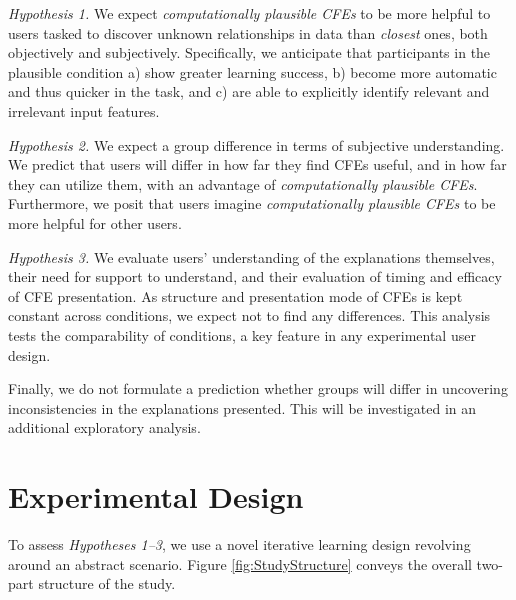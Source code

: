 \textit{Hypothesis 1.} We expect \textit{computationally plausible \glspl{CFE}} to be more helpful to users tasked to discover unknown relationships in data than \textit{closest} ones, both objectively and subjectively. 
Specifically, we anticipate that participants in the plausible condition a) show greater learning success, b) become more automatic and thus quicker in the task, and c) are able to explicitly identify relevant and irrelevant input features.

\textit{Hypothesis 2.} We expect a group difference in terms of subjective understanding.
We predict that users will differ in how far they find \glspl{CFE} useful, and in how far they can utilize them, with an advantage of \textit{computationally plausible \glspl{CFE}}. %
Furthermore, we posit that users imagine \textit{computationally plausible \glspl{CFE}} to be more helpful for other users. %

\textit{Hypothesis 3.} We evaluate users' understanding of the explanations themselves, their need for support to understand, and their evaluation of timing and efficacy of \gls{CFE} presentation. As structure and presentation mode of \glspl{CFE} is kept constant across conditions, we expect not to find any differences.
This analysis tests the comparability of conditions, a key feature in any experimental user design.

Finally, we do not formulate a prediction whether groups will differ in uncovering inconsistencies in the explanations presented. This will be investigated in an additional exploratory analysis.

\section{Experimental Design}\label{sec:experimental-design}

To assess \textit{Hypotheses 1--3}, we use a novel iterative learning design revolving around an abstract scenario. Figure \ref{fig:StudyStructure} conveys the overall two-part structure of the study.

